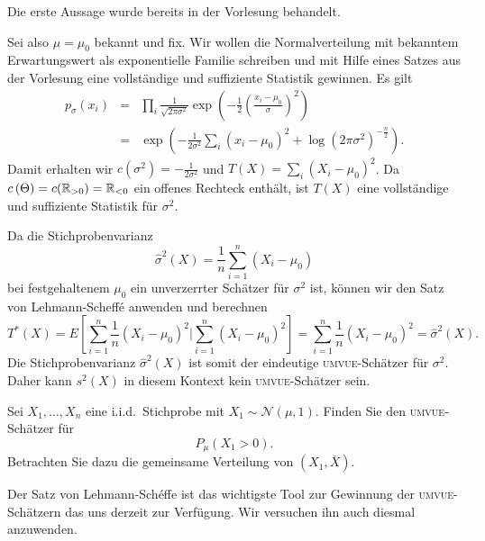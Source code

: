 \solution 
Die erste Aussage wurde bereits in der Vorlesung behandelt. 

Sei also $\mu=\mu_0$ bekannt und fix.  Wir wollen die Normalverteilung mit
bekanntem Erwartungswert als exponentielle Familie schreiben und mit Hilfe
eines Satzes aus der Vorlesung eine vollständige und suffiziente Statistik
gewinnen. Es gilt
\begin{eqnarray}
	p_\sigma(x_i) &=& \prod_i \frac{1}{\sqrt{2 \pi \sigma^2}} 
	\exp\left( -\frac{1}{2} \left( \frac{x_i - \mu_0}{\sigma}\right)^2 \right) \\
	&=& \exp\left( -\frac{1}{2 \sigma^2} \sum_{i}^{} \left( x_i - \mu_0 \right)^2 +
		\log\left( 2 \pi \sigma^2 \right)^{-\frac{n}{2}}  \right).
\end{eqnarray}
Damit erhalten wir $c(\sigma^2) = -\frac{1}{2 \sigma^2}$ und $T(X) = \sum_{i}^{} \left( X_i - \mu_0 \right)^2$.
Da $c\left( \Theta \right) = c(\mathbb R_{>0})= \mathbb R_{<0}$ ein offenes Rechteck enthält, ist $T\left( X \right)$
eine vollständige und suffiziente Statistik für $\sigma^2$.

Da die Stichprobenvarianz
\begin{equation}
	\hat\sigma^2(X) = \frac{1}{n} \sum_{i=1}^{n} (X_i - \mu_0)
\end{equation}
bei festgehaltenem $\mu_0$ ein unverzerrter Schätzer für $\sigma^2$ ist, können 
wir den Satz von Lehmann-Scheff\'e anwenden und berechnen 
\begin{equation}
	T^*\left( X \right) = E\left[ \sum_{i=1}^{n} \frac{1}{n} \left( X_i-\mu_0 \right)^2 | \sum_{i=1}^{n} \left( X_i-\mu_0 \right)^2 \right] = \sum_{i=1}^{n} \frac{1}{n} \left( X_i-\mu_0 \right)^2 = \hat\sigma^2(X).
\end{equation}
Die Stichprobenvarianz $\hat\sigma^2(X)$ ist somit der eindeutige \textsc{umvue}-Schätzer
für $\sigma^2$. Daher kann $s^2(X)$ in diesem Kontext kein
\textsc{umvue}-Schätzer sein.







 Sei $X_1,\ldots,X_n$ eine i.i.d.\
Stichprobe mit $X_1\sim\mathcal N(\mu,1)$. Finden Sie den 
\textsc{umvue}-Schätzer für
\begin{equation*}
	P_\mu (X_1>0).
\end{equation*}
Betrachten Sie dazu die gemeinsame Verteilung von $(X_1,\bar X)$.

\solution Der Satz von Lehmann-Sch\'effe ist das wichtigste Tool
zur Gewinnung der \textsc{umvue}-Schätzern das uns derzeit zur Verfügung. Wir
versuchen ihn auch diesmal anzuwenden. 


